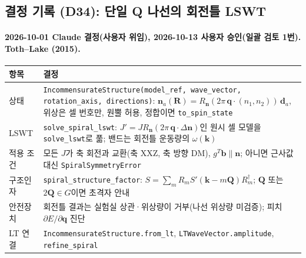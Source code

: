 \subsection{결정 기록 (D34): 단일 Q 나선의 회전틀 LSWT}\label{decisions-d34}
\begingroup%
  \framesubtitle{2026-10-01 Claude 결정(사용자 위임), 2026-10-13 사용자 승인(일괄 검토 1번). Toth--Lake (2015).}
  \small\renewcommand{\arraystretch}{1.12}
  \begin{tabularx}{\textwidth}{@{}P{3.0cm}Y@{}}
    \toprule
    항목 & 결정 \\
    \midrule
    상태 & \texttt{IncommensurateStructure(model\_ref, wave\_vector, rotation\_axis, directions)}: $\mathbf n_a(\mathbf R)=R_{\mathbf n}(2\pi\,\mathbf q\cdot(n_1,n_2))\,\mathbf d_a$, 위상은 셀 번호만, 원뿔 허용, 정합이면 \texttt{to\_spin\_state} \\
    LSWT & \texttt{solve\_spiral\_lswt}: $J'=J R_{\mathbf n}(2\pi\,\mathbf q\cdot\Delta\mathbf n)$인 원시 셀 모델을 \texttt{solve\_lswt}로 풂; 밴드는 회전틀 운동량의 $\omega(\mathbf k)$ \\
    적용 조건 & 모든 $J$가 축 회전과 교환(축 XXZ, 축 방향 DM), $g^T\mathbf b\parallel\mathbf n$; 아니면 근사값 대신 \texttt{SpiralSymmetryError} \\
    구조인자 & \texttt{spiral\_structure\_factor}: $S=\sum_m R_m S'(\mathbf k-m\mathbf Q)R_m^\dagger$; $\mathbf Q$ 또는 $2\mathbf Q\in G$이면 초격자 안내 \\
    안전장치 & 회전틀 결과는 실험실 상관·위상량이 거부(나선 위상량 미검증); 피치 $\partial E/\partial\mathbf q$ 진단 \\
    LT 연결 & \texttt{IncommensurateStructure.from\_lt}, \texttt{LTWaveVector.amplitude}, \texttt{refine\_spiral} \\
    \bottomrule
  \end{tabularx}
  \par\smallskip
\endgroup



